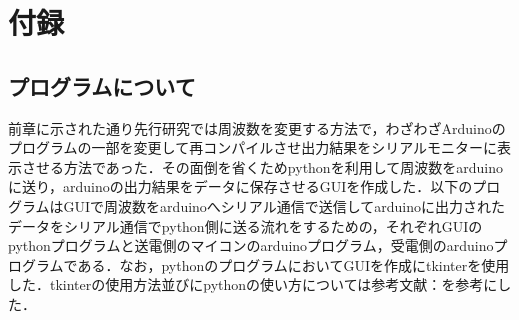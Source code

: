 \documentclass[12pt]{jarticle}
\begin{document}
\section{付録}
\subsection{プログラムについて}
前章に示された通り先行研究では周波数を変更する方法で，わざわざArduinoのプログラムの一部を変更して再コンパイルさせ出力結果をシリアルモニターに表示させる方法であった．その面倒を省くためpythonを利用して周波数をarduinoに送り，arduinoの出力結果をデータに保存させるGUIを作成した．以下のプログラムはGUIで周波数をarduinoへシリアル通信で送信してarduinoに出力されたデータをシリアル通信でpython側に送る流れをするための，それぞれGUIのpythonプログラムと送電側のマイコンのarduinoプログラム，受電側のarduinoプログラムである．なお，pythonのプログラムにおいてGUIを作成にtkinterを使用した．tkinterの使用方法並びにpythonの使い方については参考文献：\cite{tkinter}を参考にした．
\end{document}
